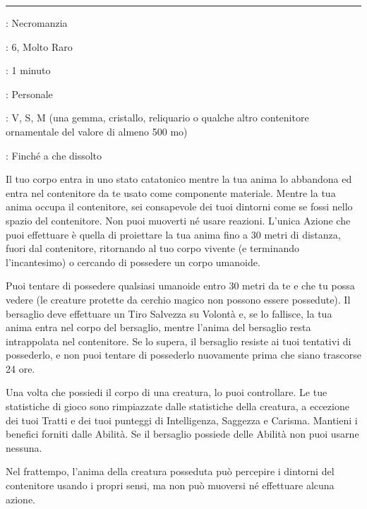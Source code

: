 \begin{multicols}{2}
\smallskip\noindent\rule{\linewidth}{2pt} \hypertarget{Giara Magica}{}\smallskip{}
\noindent
\begin{description}[noitemsep, topsep=0pt, parsep=0pt, partopsep=0pt, leftmargin=0cm, labelwidth=2.8cm]
	\item[\textbf{Lista di Magia}]: Necromanzia
	\item[\textbf{Livello}]: 6, Molto Raro
	\item[\textbf{T. di Lancio}]: 1 minuto
	\item[\textbf{Gittata}]: Personale
	\item[\textbf{Componenti}]: V, S, M (una gemma, cristallo, reliquario o qualche altro contenitore ornamentale del valore di almeno 500 mo)
	\item[\textbf{Durata}]: Finché a che dissolto
\end{description}

Il tuo corpo entra in uno stato catatonico mentre la tua anima lo abbandona ed entra nel contenitore da te usato come componente materiale. Mentre la tua anima occupa il contenitore, sei consapevole dei tuoi dintorni come se fossi nello spazio del contenitore. Non puoi muoverti né usare reazioni. L'unica Azione che puoi effettuare è quella di proiettare la tua anima fino a 30 metri di distanza, fuori dal contenitore, ritornando al tuo corpo vivente (e terminando l'incantesimo) o cercando di possedere un corpo umanoide.

Puoi tentare di possedere qualsiasi umanoide entro 30 metri da te e che tu possa vedere (le creature protette da cerchio magico non possono essere possedute). Il bersaglio deve effettuare un Tiro Salvezza su Volontà e, se lo fallisce, la tua anima entra nel corpo del bersaglio, mentre l'anima del bersaglio resta intrappolata nel contenitore. Se lo supera, il bersaglio resiste ai tuoi tentativi di possederlo, e non puoi tentare di possederlo nuovamente prima che siano trascorse 24 ore.

Una volta che possiedi il corpo di una creatura, lo puoi controllare. Le tue statistiche di gioco sono rimpiazzate dalle statistiche della creatura, a eccezione dei tuoi Tratti e dei tuoi punteggi di Intelligenza, Saggezza e Carisma. Mantieni i benefici forniti dalle Abilità. Se il bersaglio possiede delle Abilità non puoi usarne nessuna.

Nel frattempo, l'anima della creatura posseduta può percepire i dintorni del contenitore usando i propri sensi, ma non può muoversi né effettuare alcuna azione.


\end{multicols}

